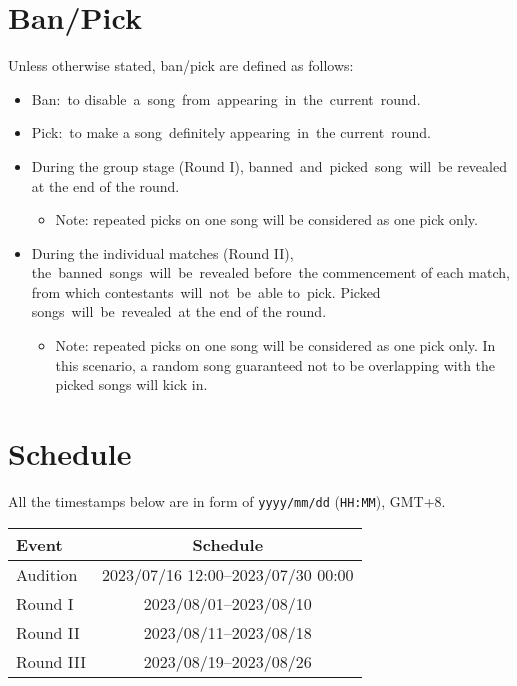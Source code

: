 \documentclass{article}
\newcommand{\alert}[1]{{\color{red} #1}}
\begin{document}
\section{Ban/Pick}
Unless otherwise stated, ban/pick are defined as follows:
\begin{itemize}
	\item Ban: to disable a song from appearing in the current round.

	\item Pick: to make a song definitely appearing in the current round.

	\item During the group stage (Round I),
	      banned and picked song will be revealed
	      at the end of the round.
	      \begin{itemize}
		      \item \alert{
			            Note: repeated picks on one
			            song will be considered as one pick only.
		            }
	      \end{itemize}

	\item During the individual matches (Round II),
	      the banned songs will be revealed before the commencement of each match,
	      from which contestants will not be able to pick.
	      Picked songs will be revealed at the end of the round.
	      \begin{itemize}
		      \item \alert{
			            Note: repeated picks on one
			            song will be considered as one pick only.
			            In this scenario, a random song guaranteed not to be
			            overlapping with the picked songs will kick in.
		            }
	      \end{itemize}
\end{itemize}

\section{Schedule}

All the timestamps below are in form of
\texttt{yyyy/mm/dd} (\texttt{HH:MM}), GMT+8.

\begin{table}[!ht]
	\centering
	\begin{tabular}{lc}
		\hline
		Event     & Schedule                           \\ \hline
		Audition  & 2023/07/16 12:00--2023/07/30 00:00 \\
		Round I   & 2023/08/01--2023/08/10             \\
		Round II  & 2023/08/11--2023/08/18             \\
		Round III & 2023/08/19--2023/08/26             \\ \hline
	\end{tabular}
\end{table}
\end{document}
